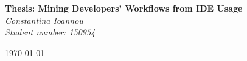 

\begin{titlepage}

\begin{center}
\vspace*{5pt}

\centering \parindent=0pt

\normalsize
        \Large

        \textbf{Thesis: Mining Developers' Workflows from IDE Usage}\\
        \textit{Constantina Ioannou}\\
        \textit {Student number: 150954}
       
        
{\large \today} 

    \end{center}
\end{titlepage}